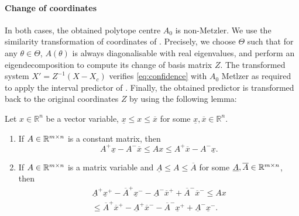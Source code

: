 \documentclass{article}
\begin{document}
\paragraph{Change of coordinates}
In both cases, the obtained polytope centre $A_0$ is non-Metzler.
We use the similarity transformation of coordinates of \citet{Efimov2013}. Precisely, we choose $\Theta$ such that for any $\theta\in\Theta$, $A(\theta)$ is always diagonalisable with real eigenvalues, and perform an eigendecomposition to compute its change of basis matrix $Z$. The transformed system $X'=Z^{-1}(X-X_c)$ verifies \eqref{eq:confidence} with $A_0$ Metlzer as required to apply the interval predictor of . Finally, the obtained predictor is transformed back to the original coordinates $Z$ by using the following lemma:
\begin{lemma}
	\label{lem:interval} Let $x\in\mathbb{R}^{n}$ be a vector variable, $\underline{x}\le x\le\overline{x}$ for some $\underline{x},\overline{x}\in\mathbb{R}^{n}$. 
	
	\begin{enumerate}
		\item If $A\in\mathbb{R}^{m\times n}$ is a constant matrix, then
		\begin{equation}
		A^{+}\underline{x}-A^{-}\overline{x}\le Ax\le A^{+}\overline{x}-A^{-}\underline{x}.\label{eq:Interval1}
		\end{equation}
		\item If $A\in\mathbb{R}^{m\times n}$ is a matrix variable and \textup{$\underline{A}\le A\le\overline{A}$} for some $\underline{A},\overline{A}\in\mathbb{R}^{m\times n}$, then
		\begin{gather}
		\underline{A}^{+}\underline{x}^{+}-\overline{A}^{+}\underline{x}^{-}-\underline{A}^{-}\overline{x}^{+}+\overline{A}^{-}\overline{x}^{-}\leq Ax\label{eq:Interval2}\\
		\leq\overline{A}^{+}\overline{x}^{+}-\underline{A}^{+}\overline{x}^{-}-\overline{A}^{-}\underline{x}^{+}+\underline{A}^{-}\underline{x}^{-}.\nonumber 
		\end{gather}
	\end{enumerate}
\end{lemma}
\end{document}
